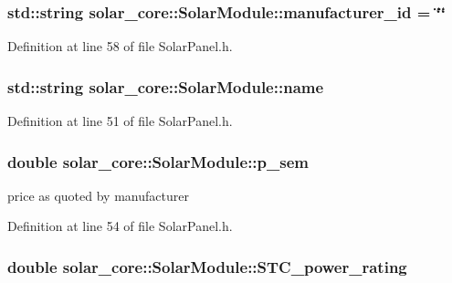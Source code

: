 \subsubsection[{manufacturer\+\_\+id}]{\setlength{\rightskip}{0pt plus 5cm}std\+::string solar\+\_\+core\+::\+Solar\+Module\+::manufacturer\+\_\+id = \char`\"{}\char`\"{}}\label{classsolar__core_1_1_solar_module_a24c71dfff1a0503fe967d11c52be05b8}


Definition at line 58 of file Solar\+Panel.\+h.

\hypertarget{classsolar__core_1_1_solar_module_abc9bb9bae1546dee017d598ef7baa952}{}
\subsubsection[{name}]{\setlength{\rightskip}{0pt plus 5cm}std\+::string solar\+\_\+core\+::\+Solar\+Module\+::name}\label{classsolar__core_1_1_solar_module_abc9bb9bae1546dee017d598ef7baa952}


Definition at line 51 of file Solar\+Panel.\+h.

\hypertarget{classsolar__core_1_1_solar_module_a34233be4549eb826fa5a4cc6a20993e3}{}
\subsubsection[{p\+\_\+sem}]{\setlength{\rightskip}{0pt plus 5cm}double solar\+\_\+core\+::\+Solar\+Module\+::p\+\_\+sem}\label{classsolar__core_1_1_solar_module_a34233be4549eb826fa5a4cc6a20993e3}
price as quoted by manufacturer 

Definition at line 54 of file Solar\+Panel.\+h.

\hypertarget{classsolar__core_1_1_solar_module_ada72a54d3a914a88fd3942f1a09065c1}{}
\subsubsection[{S\+T\+C\+\_\+power\+\_\+rating}]{\setlength{\rightskip}{0pt plus 5cm}double solar\+\_\+core\+::\+Solar\+Module\+::\+S\+T\+C\+\_\+power\+\_\+rating}\label{classsolar__core_1_1_solar_module_ada72a54d3a914a88fd3942f1a09065c1}


